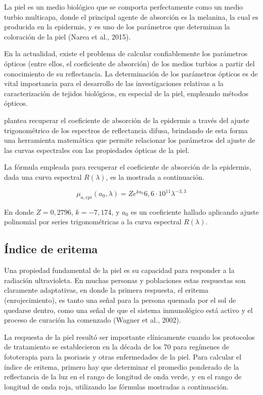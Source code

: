		La piel es un medio biol\'{o}gico que se comporta perfectamente como un medio turbio multicapa, donde el principal agente de absorci\'{o}n es la melanina, la cual es producida en la epidermis, y es uno de los par\'{a}metros que determinan la coloraci\'{o}n de la piel (Narea et al., 2015).
		
		En la actualidad, existe el problema de calcular confiablemente los par\'{a}metros \'{o}pticos (entre ellos, el coeficiente de absorci\'{o}n) de los medios turbios a partir del conocimiento de su reflectancia. La determinaci\'{o}n de los par\'{a}metros \'{o}pticos es de vital importancia para el desarrollo de las investigaciones relativas a la caracterizaci\'{o}n de tejidos biol\'{o}gicos, en especial de la piel, empleando m\'{e}todos \'{o}pticos.
		
		\cite{Narea} plantea recuperar el coeficiente de absorci\'{o}n de la epidermis a trav\'{e}s del ajuste trigonom\'{e}trico de los espectros de reflectancia difusa, brindando de esta forma una herramienta matem\'{a}tica que permite relacionar los par\'{a}metros del ajuste de las curvas espectrales con las propiedades \'{o}pticas de la piel.
		
		La f\'{o}rmula empleada para recuperar el coeficiente de absorci\'{o}n de la epidermis, dada una curva espectral $R(\lambda)$, es la mostrada a continuaci\'{o}n.
		
		$$\mu_{a,epi}(a_{0}, \lambda)=Ze^{ka_{0}}6,6 \cdot 10^{11}\lambda^{-3,3}$$
		
		En donde $Z=0,2796$, $k=-7,174$, y $a_{0}$ es un coeficiente hallado aplicando ajuste polinomial por series trigonom\'{e}tricas a la curva espectral $R(\lambda)$.
	
	\subsection{\'{I}ndice de eritema}
	
		Una propiedad fundamental de la piel es su capacidad para responder a la radiaci\'{o}n ultravioleta. En muchas personas y poblaciones estas respuestas son claramente adaptativas, en donde la primera respuesta, el eritema (enrojecimiento), es tanto una se\~{n}al para la persona quemada por el sol de quedarse dentro, como una se\~{n}al de que el sistema inmunol\'{o}gico est\'{a} activo y el proceso de curaci\'{o}n ha comenzado (Wagner et al., 2002). 
		
		La respuesta de la piel result\'{o} ser importante cl\'{i}nicamente cuando los protocolos de tratamiento se establecieron en la d\'{e}cada de los 70 para reg\'{i}menes de fototerapia para la psoriasis y otras enfermedades de la piel. Para calcular el \'{i}ndice de eritema, primero hay que determinar el promedio ponderado de la reflectancia de la luz en el rango de longitud de onda verde, y en el rango de longitud de onda roja, utilizando las f\'{o}rmulas mostradas a continuaci\'{o}n.

